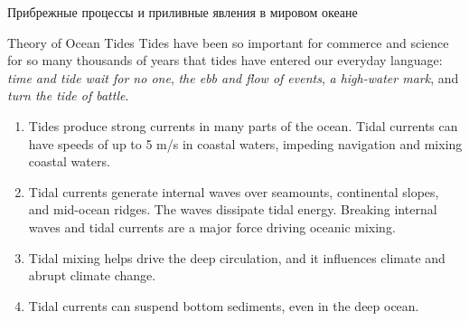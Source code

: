 \begin{chapter}{Прибрежные процессы и приливные явления в мировом океане}
\begin{section}{Theory of Ocean Tides}
 Tides have been so important for commerce
and science for so many thousands of years that tides have entered our
everyday language: \textit{time and tide wait for no one}, \textit{the
ebb and flow of events}, \textit{a high-water mark}, and \textit{turn
the tide of battle}.
%

\begin{enumerate}
\item 
Tides produce strong currents in many parts of the ocean. Tidal
currents can have speeds
of up to 5 m/s in coastal waters, impeding navigation and mixing
coastal waters.
%

\item 
Tidal currents generate
internal waves over seamounts, continental slopes, and mid-ocean
ridges. The waves dissipate tidal energy. Breaking internal waves and
tidal currents are a major force driving oceanic
mixing.
%

\item
Tidal mixing helps drive the deep circulation, and it influences
climate and abrupt climate change.
%

\item 
Tidal currents can suspend
bottom sediments, even in the deep ocean.
%


\end{enumerate}
\end{section}
\end{chapter}
